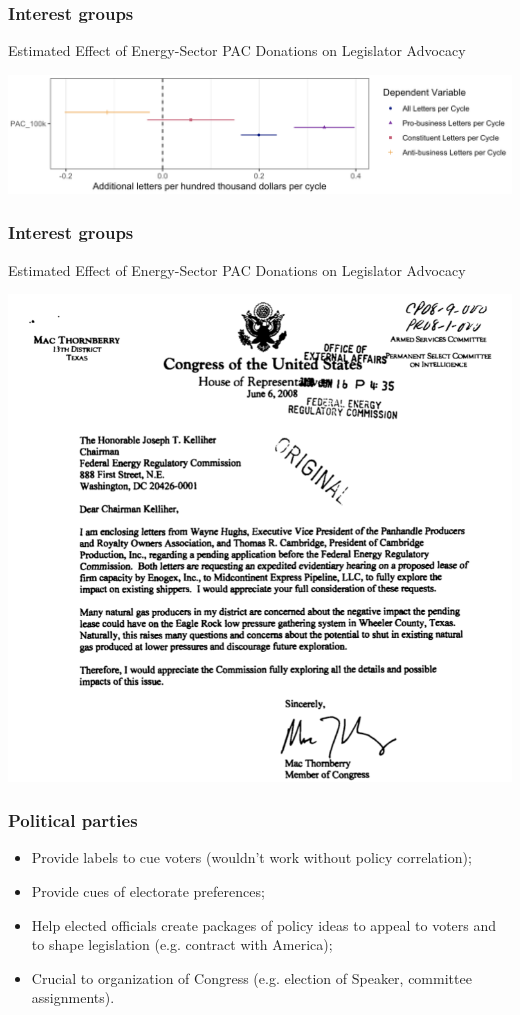 \documentclass[aspectratio=169]{beamer}
\theoremstyle{principle}
\begin{document}
\begin{frame}
\frametitle{Interest groups}
Estimated Effect of Energy-Sector PAC Donations on Legislator Advocacy 
    \begin{center}
     \includegraphics[scale=0.45]{Energy_PAC_effects.png}
     \end{center}
\end{frame}

\begin{frame}
\frametitle{Interest groups}
Estimated Effect of Energy-Sector PAC Donations on Legislator Advocacy 
    \begin{center}
     \includegraphics[scale=0.25]{FERC.png}
     \end{center}
\end{frame}

\begin{frame}
\frametitle{Political parties}
\begin{itemize}
\item Provide labels to cue voters (wouldn't work without policy correlation);
\bigskip
\bigskip
\item Provide cues of electorate preferences;
\bigskip
\bigskip
\item Help elected officials create packages of policy ideas to appeal to voters and to shape legislation (e.g. contract with America);
\bigskip
\bigskip
\item Crucial to organization of Congress (e.g. election of Speaker, committee assignments).
\end{itemize}
\end{frame}
\end{document}

